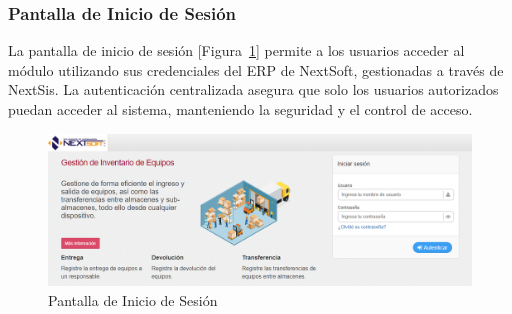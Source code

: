 \documentclass[stu, 12pt, letterpaper, donotrepeattitle, floatsintext, natbib]{apa7}
\begin{document}
\subsubsection{Pantalla de Inicio de Sesi\'on}
La pantalla de inicio de sesi\'on [Figura~\ref{loginProd}] permite a los usuarios acceder al m\'odulo utilizando sus credenciales del ERP de NextSoft, gestionadas a trav\'es de NextSis. La autenticaci\'on centralizada asegura que solo los usuarios autorizados puedan acceder al sistema, manteniendo la seguridad y el control de acceso.
\begin{figure}[H]
    \centering
    \caption{Pantalla de Inicio de Sesi\'on}\label{loginProd}
    \includegraphics[width=16.5cm]{./images/loginProd.png}
\end{figure}
\end{document}
